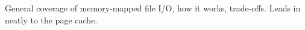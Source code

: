 General coverage of memory-mapped file I/O, how it works, trade-offs. Leads in
neatly to the page cache.\\
